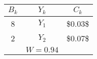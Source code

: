     \begin{tabular}{ccc}
    $B_k$   & $Y_k$   & $C_k$ \bigstrut[b]\\
    \hline
    8       & $Y_1$   & \$0.03\$ \bigstrut[t]\\
    2       & $Y_2$   & \$0.07\$ \bigstrut[b]\\
    \hline
            & $W=0.94$ &  \bigstrut\\
    \hline
    \hline
    \end{tabular}%
